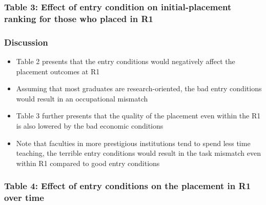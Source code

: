 \documentclass[10pt,svgnames,fragile]{beamer}
\begin{document}
{{
\begin{frame}
	\frametitle{Table 3: Effect of entry condition on  initial-placement ranking   for those who placed in R1}
	
\end{frame}}


\begin{frame}
	\frametitle{Discussion}
	\begin{itemize}
		\item Table 2 presents that the entry conditions would negatively affect the placement outcomes at R1
		\vspace{2 mm}
		\item Assuming that most graduates are research-oriented, the bad entry conditions would result in an occupational mismatch
		\vspace{2 mm}
		\item Table 3 further presents that the quality of the placement even within the R1 is also lowered by the bad economic conditions
		\vspace{2 mm}
		\item Note that faculties in more prestigious institutions tend to spend less time teaching, the terrible entry conditions would result in the task mismatch even within R1 compared to good entry conditions
		\vspace{2 mm}
	\end{itemize}
\end{frame}



{
\begin{frame}
	\frametitle{Table 4: Effect of entry conditions on the placement in R1  over time}
	
\end{frame}}

%	



}
\end{document}
